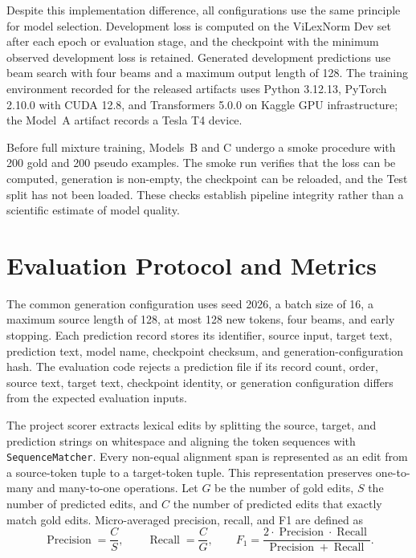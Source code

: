 \documentclass[11pt]{article}
\begin{document}
Despite this implementation difference, all configurations use the same principle for model selection. Development loss is computed on the ViLexNorm Dev set after each epoch or evaluation stage, and the checkpoint with the minimum observed development loss is retained. Generated development predictions use beam search with four beams and a maximum output length of 128. The training environment recorded for the released artifacts uses Python 3.12.13, PyTorch 2.10.0 with CUDA 12.8, and Transformers 5.0.0 on Kaggle GPU infrastructure; the Model~A artifact records a Tesla T4 device.

Before full mixture training, Models~B and C undergo a smoke procedure with 200 gold and 200 pseudo examples. The smoke run verifies that the loss can be computed, generation is non-empty, the checkpoint can be reloaded, and the Test split has not been loaded. These checks establish pipeline integrity rather than a scientific estimate of model quality.

\section{Evaluation Protocol and Metrics}

The common generation configuration uses seed 2026, a batch size of 16, a maximum source length of 128, at most 128 new tokens, four beams, and early stopping. Each prediction record stores its identifier, source input, target text, prediction text, model name, checkpoint checksum, and generation-configuration hash. The evaluation code rejects a prediction file if its record count, order, source text, target text, checkpoint identity, or generation configuration differs from the expected evaluation inputs.

The project scorer extracts lexical edits by splitting the source, target, and prediction strings on whitespace and aligning the token sequences with \texttt{SequenceMatcher}. Every non-equal alignment span is represented as an edit from a source-token tuple to a target-token tuple. This representation preserves one-to-many and many-to-one operations. Let $G$ be the number of gold edits, $S$ the number of predicted edits, and $C$ the number of predicted edits that exactly match gold edits. Micro-averaged precision, recall, and F1 are defined as
\begin{equation}
\operatorname{Precision}=\frac{C}{S}, \qquad
\operatorname{Recall}=\frac{C}{G}, \qquad
F_1=\frac{2\cdot\operatorname{Precision}\cdot\operatorname{Recall}}
{\operatorname{Precision}+\operatorname{Recall}}.
\end{equation}
\end{document}
